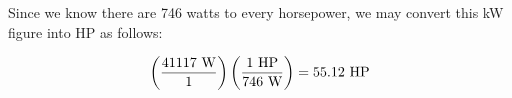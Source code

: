 \vskip 10pt

Since we know there are 746 watts to every horsepower, we may convert this kW figure into HP as follows:

$$\left({41117 \hbox{ W} \over 1}\right) \left({1 \hbox{ HP} \over 746 \hbox{ W}}\right) = 55.12 \hbox{ HP}$$











